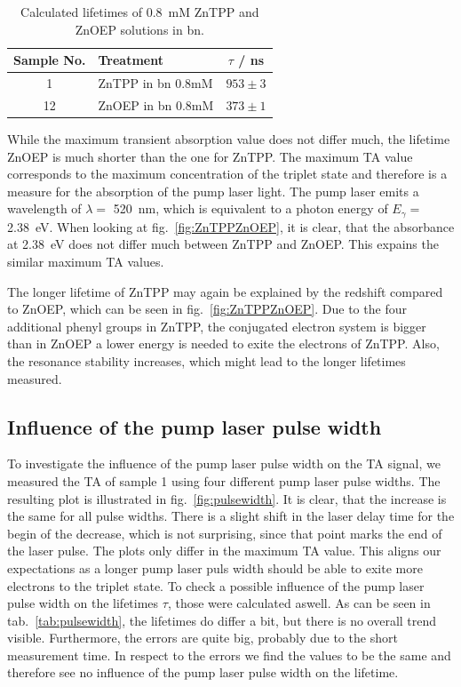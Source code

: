 \begin{table}[ht]
    \centering
    \begin{tabular}{clc}
        \toprule
        Sample No. &    Treatment &    $\tau$ / \si{\nano\second} \\
        \midrule
        1 &     ZnTPP in bn 0.8mM &  $953 \pm 3$ \\
        12 &     ZnOEP in bn 0.8mM &  $373 \pm 1$\\
        \bottomrule
    \end{tabular}
    \caption{Calculated lifetimes of \SI{0.8}{\milli\nauticalmile} ZnTPP and ZnOEP solutions in bn.}
    \label{tab:ZnTPP-ZnOEP}
\end{table}

While the maximum transient absorption value does not differ much, the lifetime ZnOEP is much shorter than the one for ZnTPP. The maximum TA value corresponds to the maximum concentration of the triplet state and therefore is a measure for the absorption of the pump laser light. The pump laser emits a wavelength of $\lambda = $ \SI{520}{\nano\metre}, which is equivalent to a photon energy of $E_{\gamma} = $ \SI{2.38}{\eV}. When looking at fig.~\ref{fig:ZnTPPZnOEP}, it is clear, that the absorbance at \SI{2.38}{\eV} does not differ much between ZnTPP and ZnOEP. This expains the similar maximum TA values. \par 
The longer lifetime of ZnTPP may again be explained by the redshift compared to ZnOEP, which can be seen in fig.~\ref{fig:ZnTPPZnOEP}. Due to the four additional phenyl groups in ZnTPP, the conjugated electron system is bigger than in ZnOEP a lower energy is needed to exite the electrons of ZnTPP. Also, the resonance stability increases, which might lead to the longer lifetimes measured.

\subsection*{Influence of the pump laser pulse width}
To investigate the influence of the pump laser pulse width on the TA signal, we measured the TA of sample 1 using four different pump laser pulse widths. The resulting plot is illustrated in fig.~\ref{fig:pulsewidth}. It is clear, that the increase is the same for all pulse widths. There is a slight shift in the laser delay time for the begin of the decrease, which is not surprising, since that point marks the end of the laser pulse. The plots only differ in the maximum TA value. This aligns our expectations as a longer pump laser puls width should be able to exite more electrons to the triplet state. To check a possible influence of the pump laser pulse width on the lifetimes $\tau$, those were calculated aswell. As can be seen in tab.~\ref{tab:pulsewidth}, the lifetimes do differ a bit, but there is no overall trend visible. Furthermore, the errors are quite big, probably due to the short measurement time. In respect to the errors we find the values to be the same and therefore see no influence of the pump laser pulse width on the lifetime.

